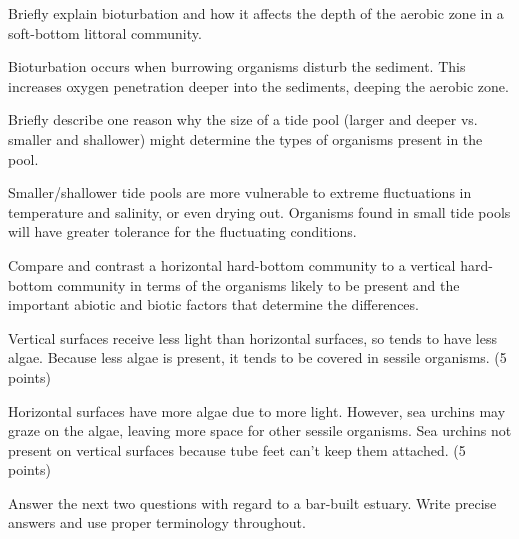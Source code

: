 \documentclass[11pt]{exam}
\begin{document}
\begin{questions}
\question[5]
Briefly explain bioturbation and how it affects the depth of the aerobic zone in a soft-bottom littoral community.
	\begin{solution}
	Bioturbation occurs when burrowing organisms disturb the sediment. This increases oxygen penetration deeper into the sediments, deeping the aerobic zone. 
	\end{solution}

\newpage

\question[5]
Briefly describe one reason why the size of a tide pool (larger and deeper vs. smaller and shallower) might determine the types of organisms present in the pool.
	\begin{solution}
	Smaller/shallower tide pools are more vulnerable to extreme fluctuations in temperature and salinity, or even drying out. Organisms found in small tide pools will have greater tolerance for the fluctuating conditions.
	\end{solution}

\question[10]
Compare and contrast a horizontal hard-bottom community to a vertical hard-bottom community in terms of the organisms likely to be present and the important abiotic and biotic factors that determine the differences.

	\begin{solution}
	Vertical surfaces receive less light than horizontal surfaces, so tends to have less algae. Because less algae is present, it tends to be covered in sessile organisms. (5 points)

	Horizontal surfaces have more algae due to more light. However, sea urchins may graze on the algae, leaving more space for other sessile organisms. Sea urchins not present on vertical surfaces because tube feet can't keep them attached. (5 points)
	\end{solution}
\newpage

\question
Answer the next two questions with regard to a bar-built estuary. Write precise answers and use proper terminology throughout. 
\end{questions}
\end{document}
